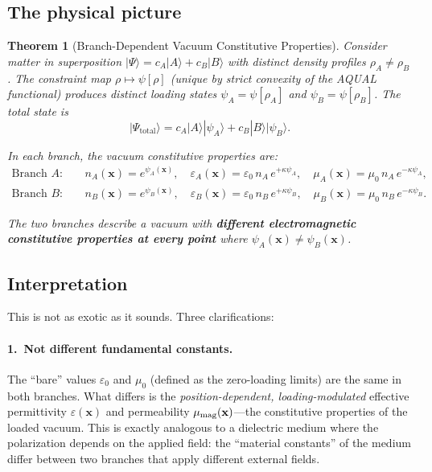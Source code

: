 \documentclass[11pt,a4paper]{article}
\newtheorem{theorem}{Theorem}[section]
\begin{document}
\subsection{The physical picture}

\begin{theorem}[Branch-Dependent Vacuum Constitutive Properties]
\label{thm:branch-constitutive}
Consider matter in superposition $|\Psi\rangle = c_A|A\rangle + c_B|B\rangle$
with distinct density profiles $\rho_A \neq \rho_B$.  The constraint map
$\rho \mapsto \psi[\rho]$ (unique by strict convexity of the AQUAL
functional) produces distinct loading states $\psi_A = \psi[\rho_A]$ and
$\psi_B = \psi[\rho_B]$.  The total state is
\begin{equation}
|\Psi_{\mathrm{total}}\rangle
= c_A|A\rangle|\psi_A\rangle + c_B|B\rangle|\psi_B\rangle.
\end{equation}

In each branch, the vacuum constitutive properties are:
\begin{align}
\text{Branch } A: \quad &
n_A(\mathbf{x}) = e^{\psi_A(\mathbf{x})}, \quad
\varepsilon_A(\mathbf{x}) = \varepsilon_0\, n_A\, e^{+\kappa\psi_A}, \quad
\mu_A(\mathbf{x}) = \mu_0\, n_A\, e^{-\kappa\psi_A}, \\
\text{Branch } B: \quad &
n_B(\mathbf{x}) = e^{\psi_B(\mathbf{x})}, \quad
\varepsilon_B(\mathbf{x}) = \varepsilon_0\, n_B\, e^{+\kappa\psi_B}, \quad
\mu_B(\mathbf{x}) = \mu_0\, n_B\, e^{-\kappa\psi_B}.
\end{align}

The two branches describe a vacuum with \textbf{different electromagnetic
constitutive properties at every point} where $\psi_A(\mathbf{x}) \neq
\psi_B(\mathbf{x})$.
\end{theorem}

\subsection{Interpretation}

This is not as exotic as it sounds.  Three clarifications:

\paragraph{1.\ Not different fundamental constants.}
The ``bare'' values $\varepsilon_0$ and $\mu_0$ (defined as the zero-loading
limits) are the same in both branches.  What differs is the
\emph{position-dependent, loading-modulated} effective permittivity
$\varepsilon(\mathbf{x})$ and permeability $\mu_{\rm mag}(\mathbf{x})$---the
constitutive properties of the loaded vacuum.  This is exactly analogous to a
dielectric medium where the polarization depends on the applied field: the
``material constants'' of the medium differ between two branches that apply
different external fields.
\end{document}
